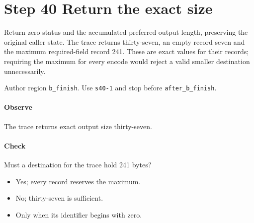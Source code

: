 \section{Step 40 Return the exact size}\label{cbor-s40}
Return zero status and the accumulated preferred output length, preserving the original caller state. The trace returns thirty-seven, an empty record seven and the maximum required-field record 241. These are exact values for their records; requiring the maximum for every encode would reject a valid smaller destination unnecessarily.

Author region \texttt{b\_finish}. Use \texttt{s40-1} and stop before \texttt{after\_b\_finish}.

\paragraph{Observe} The trace returns exact output size thirty-seven.

\paragraph{Check} Must a destination for the trace hold 241 bytes?
\begin{itemize}
  \item[A.] Yes; every record reserves the maximum.
  \item[B.] No; thirty-seven is sufficient.
  \item[C.] Only when its identifier begins with zero.
\end{itemize}
